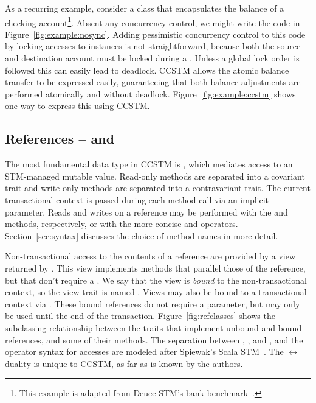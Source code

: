 



As a recurring example, consider a class that encapsulates the balance of
a checking account\footnote{This example is adapted from Deuce STM's bank
benchmark~\cite{deucestm}.}.  Absent any concurrency control, we might
write the code in Figure~\ref{fig:example:nosync}.  Adding pessimistic
concurrency control to this code by locking accesses to 
instances is not straightforward, because both the source and destination
account must be locked during a .  Unless a global lock
order is followed this can easily lead to deadlock.  CCSTM allows the
atomic balance transfer to be expressed easily, guaranteeing that both
balance adjustments are performed atomically and without deadlock.
Figure~\ref{fig:example:ccstm} shows one way to express this using CCSTM.


\subsection{References --  and }

The most fundamental data type in CCSTM is , which mediates
access to an STM-managed mutable value.  Read-only methods are separated into a
covariant  trait and write-only methods are separated into a
contravariant  trait.  The current transactional context is passed
during
each method call via an implicit parameter.  Reads and writes on a
reference may be performed with the  and  methods,
respectively, or with the more concise  and \code{:=}
operators.  Section~\ref{sec:syntax} discusses
the choice of method names in more detail.

Non-transactional access to the contents of a reference are provided by a view
returned by .  This view implements methods that parallel those of
the reference, but that don't require a .  We say that the view
is \textit{bound} to the non-transactional context, so the view trait is
named .  Views may also be bound to a transactional context
via .  These bound references do not require a 
parameter, but may only be used until the end of the transaction.
Figure~\ref{fig:refclasses} shows the
subclassing relationship between the traits that implement unbound
and bound references, and some of their methods.  The separation between
, , and , and the operator syntax for
accesses are modeled after Spiewak's Scala STM~\cite{github:spiewak}.
The  $ \leftrightarrow $  duality is unique
to CCSTM, as far as is known by the authors.

